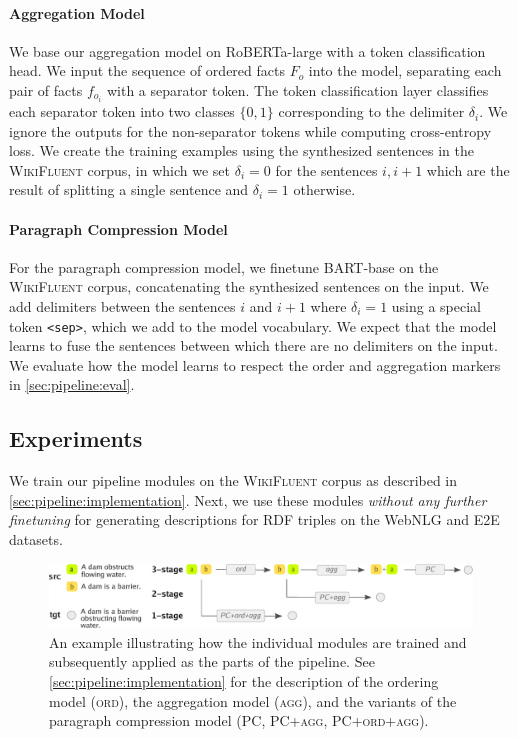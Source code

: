 \paragraph{Aggregation Model}
We base our aggregation model on RoBERTa-large \cite{liuRoBERTaRobustlyOptimized2019} with a token classification head. We input the sequence of ordered facts $F_o$ into the model, separating each pair of facts $f_{o_i}$ with a separator token. The token classification layer classifies each separator token into two classes $\{0,1\}$ corresponding to the delimiter $\delta_i$. We ignore the outputs for the non-separator tokens while computing cross-entropy loss. We create the training examples using the synthesized sentences in the \textsc{WikiFluent} corpus, in which we set $\delta_i=0$ for the sentences $i,i+1$ which are the result of splitting a single sentence and $\delta_i=1$ otherwise.

\paragraph{Paragraph Compression Model} For the paragraph compression model, we finetune BART-base \cite{lewisBARTDenoisingSequencetoSequence2019} on the \textsc{WikiFluent} corpus, concatenating the synthesized sentences on the input. We add delimiters between the sentences $i$ and $i+1$ where $\delta_i=1$ using a special token \texttt{<sep>}, which we add to the model vocabulary. We expect that the model learns to fuse the sentences between which there are no delimiters on the input. We evaluate how the model learns to respect the order and aggregation markers in \autoref{sec:pipeline:eval}.


\subsection{Experiments}
\label{sec:pipeline:experiments}
We train our pipeline modules on the \textsc{WikiFluent} corpus as described in \autoref{sec:pipeline:implementation}. Next, we use these modules \textit{without any further finetuning} for generating descriptions for RDF triples on the WebNLG and E2E datasets.


\begin{figure}[t]
    \centering
    \includegraphics[width=\textwidth]{img/pipeline-variants.pdf}

    \caption{An example illustrating how the individual modules are trained and subsequently applied as the parts of the pipeline. See \autoref{sec:pipeline:implementation} for the description of the ordering model (\textsc{ord}), the aggregation model (\textsc{agg}), and the variants of the paragraph compression model (\textsc{PC, PC+agg, PC+ord+agg}).}
    \label{fig:pipeline:variants}
\end{figure}


